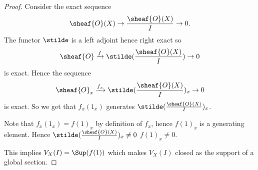 
\begin{proof}
Consider the exact sequence 
\[\sheaf{O}(X)\rightarrow \frac{\sheaf{O}(X)}{I} \rightarrow 0.\]
The functor $\stilde$ is a left adjoint hence right exact so 
\[\sheaf{O} \xrightarrow{f} \stilde(\frac{\sheaf{O}(X)}{I}) \rightarrow 0\]
is exact.
Hence the sequence
\[\sheaf{O}_x \xrightarrow{f_x} \stilde(\frac{\sheaf{O}(X)}{I})_x \rightarrow 0\]
is exact. 
So we get that $f_x(1_x)$ generates $\stilde(\frac{\sheaf{O}(X)}{I})_x$.

Note that $f_x(1_x) = f(1)_x$ by definition of $f_x$, hence $f(1)_x$ is a generating element.
Hence $\stilde(\frac{\sheaf{O}(X)}{I})_x \neq 0$ \iff $f(1)_x \neq 0$. 

This implies $V_X(I) = \Sup(f(1))$ which makes $V_X(I)$ closed as the support of a global section.
\end{proof}
